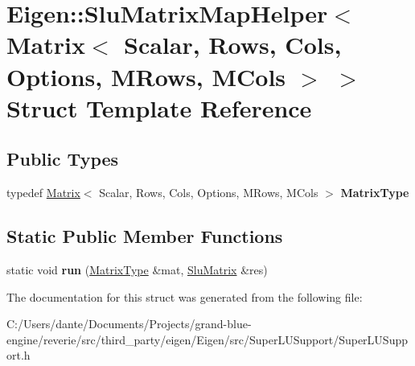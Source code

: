 \hypertarget{struct_eigen_1_1_slu_matrix_map_helper_3_01_matrix_3_01_scalar_00_01_rows_00_01_cols_00_01_optioce31c400c0dc6b34c9e9bbf922bc7aae}{}\section{Eigen\+::Slu\+Matrix\+Map\+Helper$<$ Matrix$<$ Scalar, Rows, Cols, Options, M\+Rows, M\+Cols $>$ $>$ Struct Template Reference}
\label{struct_eigen_1_1_slu_matrix_map_helper_3_01_matrix_3_01_scalar_00_01_rows_00_01_cols_00_01_optioce31c400c0dc6b34c9e9bbf922bc7aae}
\subsection*{Public Types}
\begin{DoxyCompactItemize}
\item 
\mbox{\label{struct_eigen_1_1_slu_matrix_map_helper_3_01_matrix_3_01_scalar_00_01_rows_00_01_cols_00_01_optioce31c400c0dc6b34c9e9bbf922bc7aae_a54655c68633ab3e126220e2f13118ea8}} 
typedef \mbox{\hyperlink{class_eigen_1_1_matrix}{Matrix}}$<$ Scalar, Rows, Cols, Options, M\+Rows, M\+Cols $>$ {\bfseries Matrix\+Type}
\end{DoxyCompactItemize}
\subsection*{Static Public Member Functions}
\begin{DoxyCompactItemize}
\item 
\mbox{\label{struct_eigen_1_1_slu_matrix_map_helper_3_01_matrix_3_01_scalar_00_01_rows_00_01_cols_00_01_optioce31c400c0dc6b34c9e9bbf922bc7aae_a359c47a6e575a4424c3c04bf56872290}} 
static void {\bfseries run} (\mbox{\hyperlink{class_eigen_1_1_matrix}{Matrix\+Type}} \&mat, \mbox{\hyperlink{struct_eigen_1_1_slu_matrix}{Slu\+Matrix}} \&res)
\end{DoxyCompactItemize}


The documentation for this struct was generated from the following file\+:\begin{DoxyCompactItemize}
\item 
C\+:/\+Users/dante/\+Documents/\+Projects/grand-\/blue-\/engine/reverie/src/third\+\_\+party/eigen/\+Eigen/src/\+Super\+L\+U\+Support/Super\+L\+U\+Support.\+h\end{DoxyCompactItemize}
